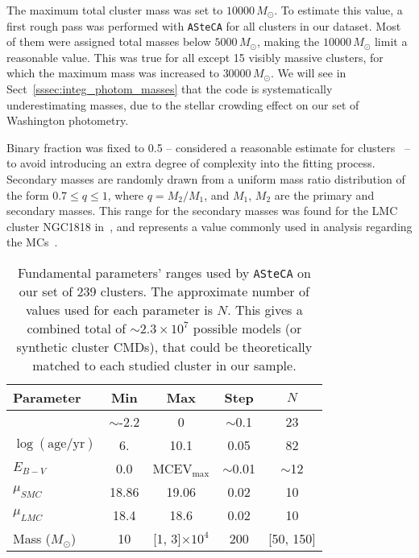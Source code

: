 \documentclass[draft]{aa}
\begin{document}
The maximum total cluster mass was set to $10000\,M_{\odot}$.
%
To estimate this value, a first rough pass was performed with
\texttt{ASteCA} for all clusters in our dataset. Most of them were assigned
total masses below $5000\,M_{\odot}$, making the $10000\,M_{\odot}$ limit a
reasonable value.
%
This was true for all except 15 visibly massive clusters, for which the
maximum mass was increased to $30000\,M_{\odot}$. We will see
in Sect~\ref{sssec:integ_photom_masses} that the code is systematically
underestimating masses, due to the stellar crowding effect on our set of
Washington photometry.

Binary fraction was fixed to 0.5 -- considered a
reasonable estimate for clusters~\citep{von_Hippel_2005,Sollima_2010} -- to
avoid introducing an extra degree of complexity into the fitting process.
Secondary masses are randomly drawn from a uniform mass ratio distribution of
the form $0.7{\le}q{\le}1$, where $q{=}M_2/M_1$, and $M_1$, $M_2$ are the
primary and secondary masses. This range for the secondary masses was found for
the LMC cluster NGC1818 in~\cite{Elson_1998}, and represents a value
commonly used in analysis regarding the MCs~\citep[see][and references therein]
{Rubele_2011}.

\begin{table}
\centering
\caption{Fundamental parameters' ranges used by \texttt{ASteCA} on our set
of 239 clusters. The approximate number of values used for each parameter is
$N$. This gives a combined total of ${\sim}2.3 {\times}10^7$ possible models 
(or synthetic cluster CMDs), that could be theoretically matched to each studied
cluster in our sample.}
\label{tab:ga-range}
\begin{tabular}{lcccc}
\hline\hline
 Parameter & Min & Max & Step & $N$\\
\hline
[Fe/H] & $\sim$-2.2 & 0 & $\sim$0.1 & 23\\
$\log\mathrm{(age/yr)}$ & 6. & 10.1 & 0.05 & 82\\
$E_{B-V}$ & 0.0 & MCEV$_{\max}$ & ${\sim}$0.01 & $\sim$12\\
$\mu_{SMC}$ & 18.86 & 19.06 & 0.02 & 10\\
$\mu_{LMC}$ & 18.4 & 18.6 & 0.02 & 10\\
Mass ($M_{\odot}$) & 10 & [1, 3]${\times}10^{4}$ & 200 & [50, 150]\\
\hline
\end{tabular}
\end{table}
\end{document}
